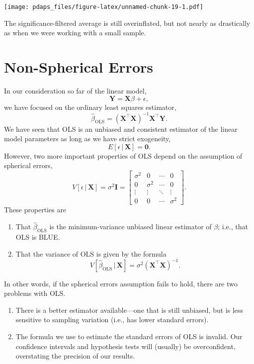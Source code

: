 \documentclass[
  12pt,
  oneside,openany]{book}
\begin{document}
\texttt{[image: pdaps\_files/figure-latex/unnamed-chunk-19-1.pdf]}

The significance-filtered average is still overinflated, but not nearly as drastically as when we were working with a small sample.

\hypertarget{nonspherical}{%
\chapter{Non-Spherical Errors}\label{nonspherical}}

In our consideration so far of the linear model,
\[
\mathbf{Y} = \mathbf{X} \beta + \epsilon,
\]
we have focused on the ordinary least squares estimator,
\[
\hat{\beta}_{\text{OLS}} = (\mathbf{X}^\top \mathbf{X})^{-1} \mathbf{X}^\top \mathbf{Y}.
\]
We have seen that OLS is an unbiased and consistent estimator of the linear model parameters as long as we have strict exogeneity,
\[
E[\epsilon \,|\, \mathbf{X}] = \mathbf{0}.
\]
However, two more important properties of OLS depend on the assumption of spherical errors,
\[
V[\epsilon \,|\, \mathbf{X}] = \sigma^2 \mathbf{I} = \begin{bmatrix}
  \sigma^2 & 0 & \cdots & 0 \\
  0 & \sigma^2 & \cdots & 0 \\
  \vdots & \vdots & \ddots & \vdots \\
  0 & 0 & \cdots & \sigma^2
\end{bmatrix}.
\]
These properties are

\begin{enumerate}
\def\labelenumi{\arabic{enumi}.}
\item
  That \(\hat{\beta}_{\text{OLS}}\) is the minimum-variance unbiased linear estimator of \(\beta\); i.e., that OLS is BLUE.
\item
  That the variance of OLS is given by the formula
  \[
  V[\hat{\beta}_{\text{OLS}} \,|\, \mathbf{X}] = \sigma^2 (\mathbf{X}^\top \mathbf{X})^{-1}.
  \]
\end{enumerate}

In other words, if the spherical errors assumption fails to hold, there are two problems with OLS.

\begin{enumerate}
\def\labelenumi{\arabic{enumi}.}
\item
  There is a better estimator available---one that is still unbiased, but is less sensitive to sampling variation (i.e., has lower standard errors).
\item
  The formula we use to estimate the standard errors of OLS is invalid. Our confidence intervals and hypothesis tests will (usually) be overconfident, overstating the precision of our results.
\end{enumerate}
\end{document}
